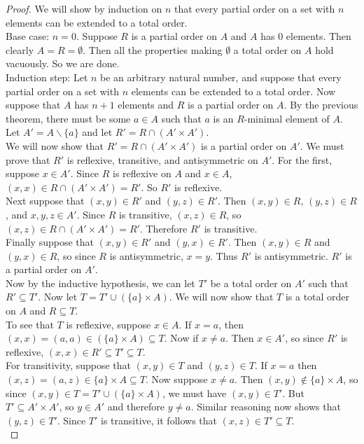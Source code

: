 \documentclass{report}
\theoremstyle{definition}
\begin{document}
\begin{proof}
We will show by induction on $n$ that every partial order on a set with $n$ elements can be extended to a total order.\\
\indent Base case: $n=0$. Suppose $R$ is a partial order on $A$ and $A$ has 0 elements. Then clearly $A=R=\emptyset$. 
Then all the properties making $\emptyset$ a total order on $A$ hold vacuously. So we are done.\\
\indent Induction step: Let $n$ be an arbitrary natural number, and suppose that every partial order on a set with $n$ elements can be extended
to a total order. Now suppose that $A$ has $n+1$ elements and $R$ is a partial order on $A$. By the previous theorem, 
there must be some $a\in A$ such that $a$ is an $R$-minimal element of $A$. Let $A'=A\backslash\{a\}$ and let $R'=R\cap(A'\times A')$.\\
\indent We will now show that $R'=R\cap(A'\times A')$ is a partial order on $A'$. We must prove that $R'$ is reflexive, transitive, 
and antisymmetric on $A'$. For the first, suppose $x\in A'$. Since $R$ is reflexive on $A$ and $x\in A$, $(x,x)\in R\cap(A'\times A')=R'$. So
$R'$ is reflexive.\\
\indent Next suppose that $(x,y)\in R'$ and $(y,z)\in R'$. Then $(x,y)\in R$, $(y,z)\in R$, and $x,y,z\in A'$. Since $R$ is transitive, 
$(x,z)\in R$, so $(x,z)\in R\cap(A'\times A')=R'$. Therefore $R'$ is transitive.\\
\indent Finally suppose that $(x,y)\in R'$ and $(y,x)\in R'$. Then $(x,y)\in R$ and $(y,x)\in R$, so since $R$ is antisymmetric, $x=y$. 
Thus $R'$ is antisymmetric. $R'$ is a partial order on $A'$.\\
\indent Now by the inductive hypothesis, we can let $T'$ be a total order on $A'$ such that $R'\subseteq T'$. Now let $T=T'\cup(\{a\}\times A)$.
We will now show that $T$ is a total order on $A$ and $R\subseteq T$.\\
\indent To see that $T$ is reflexive, suppose $x\in A$. If $x=a$, then $(x,x)=(a,a)\in(\{a\}\times A)\subseteq T$. Now if $x\neq a$. Then
$x\in A'$, so since $R'$ is reflexive, $(x,x)\in R'\subseteq T'\subseteq T$.\\
\indent For transitivity, suppose that $(x,y)\in T$ and $(y,z)\in T$. 
If $x=a$ then $(x,z)=(a,z)\in\{a\}\times A\subseteq T$. Now suppose $x\neq a$. Then $(x,y)\notin\{a\}\times A$,
so since $(x,y)\in T=T'\cup(\{a\}\times A)$, we must have $(x,y)\in T'$.
But $T'\subseteq A'\times A'$, so $y\in A'$ and therefore $y\neq a$.
Similar reasoning now shows that $(y,z)\in T'$. Since $T'$ is transitive, it follows that $(x,z)\in T'\subseteq T$.\\

\end{proof}
\end{document}
